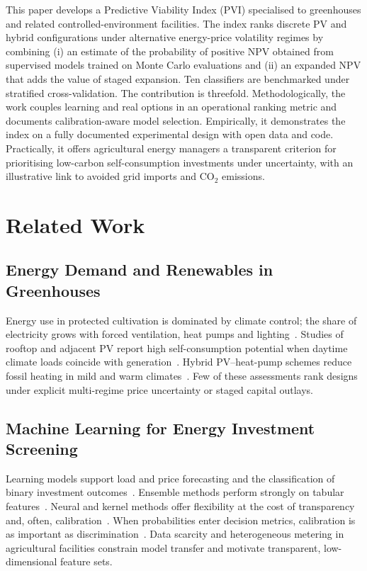 \documentclass[agriengineering,article,submit,pdftex,moreauthors]{Definitions/mdpi}
\begin{document}
This paper develops a Predictive Viability Index (PVI) specialised to greenhouses and related controlled-environment facilities. The index ranks discrete PV and hybrid configurations under alternative energy-price volatility regimes by combining (i) an estimate of the probability of positive NPV obtained from supervised models trained on Monte Carlo evaluations and (ii) an expanded NPV that adds the value of staged expansion. Ten classifiers are benchmarked under stratified cross-validation. The contribution is threefold. Methodologically, the work couples learning and real options in an operational ranking metric and documents calibration-aware model selection. Empirically, it demonstrates the index on a fully documented experimental design with open data and code. Practically, it offers agricultural energy managers a transparent criterion for prioritising low-carbon self-consumption investments under uncertainty, with an illustrative link to avoided grid imports and CO$_2$ emissions.

\section{Related Work}

\subsection{Energy Demand and Renewables in Greenhouses}

Energy use in protected cultivation is dominated by climate control; the share of electricity grows with forced ventilation, heat pumps and lighting~\cite{ref-cigr,ref-vadiee,ref-vanbeveren}. Studies of rooftop and adjacent PV report high self-consumption potential when daytime climate loads coincide with generation~\cite{ref-pvgreen,ref-yildirim,ref-allardyce}. Hybrid PV--heat-pump schemes reduce fossil heating in mild and warm climates~\cite{ref-heatpump,ref-bambara}. Few of these assessments rank designs under explicit multi-regime price uncertainty or staged capital outlays.

\subsection{Machine Learning for Energy Investment Screening}

Learning models support load and price forecasting and the classification of binary investment outcomes~\cite{ref-deb,ref-wang,ref-chen,ref-bourdeau,ref-ahmad}. Ensemble methods perform strongly on tabular features~\cite{ref-breiman,ref-chen,ref-friedman}. Neural and kernel methods offer flexibility at the cost of transparency and, often, calibration~\cite{ref-guo,ref-niculescu}. When probabilities enter decision metrics, calibration is as important as discrimination~\cite{ref-degroot,ref-ferri}. Data scarcity and heterogeneous metering in agricultural facilities constrain model transfer and motivate transparent, low-dimensional feature sets.
\end{document}
